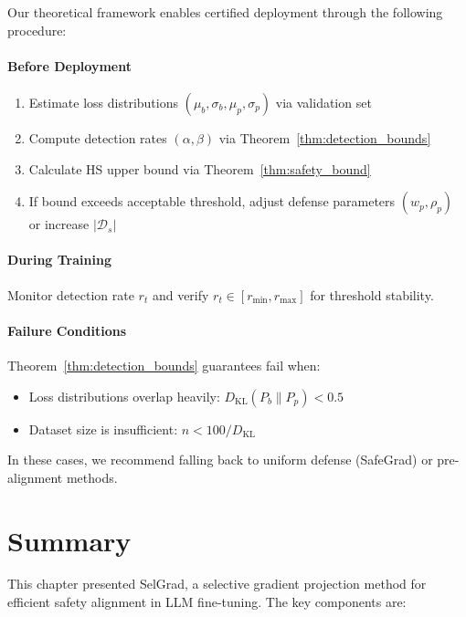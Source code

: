 Our theoretical framework enables certified deployment through the following procedure:

\paragraph{Before Deployment}
\begin{enumerate}
    \item Estimate loss distributions $(\mu_b, \sigma_b, \mu_p, \sigma_p)$ via validation set
    \item Compute detection rates $(\alpha, \beta)$ via Theorem~\ref{thm:detection_bounds}
    \item Calculate HS upper bound via Theorem~\ref{thm:safety_bound}
    \item If bound exceeds acceptable threshold, adjust defense parameters $(w_p, \rho_p)$ or increase $|\mathcal{D}_s|$
\end{enumerate}

\paragraph{During Training}
Monitor detection rate $r_t$ and verify $r_t \in [r_{\min}, r_{\max}]$ for threshold stability.

\paragraph{Failure Conditions}
Theorem~\ref{thm:detection_bounds} guarantees fail when:
\begin{itemize}
    \item Loss distributions overlap heavily: $D_{\text{KL}}(P_b \| P_p) < 0.5$
    \item Dataset size is insufficient: $n < 100/D_{\text{KL}}$
\end{itemize}

In these cases, we recommend falling back to uniform defense (SafeGrad) or pre-alignment methods.

\section{Summary}
\label{sec:method_summary}

This chapter presented SelGrad, a selective gradient projection method for efficient safety alignment in LLM fine-tuning. The key components are:

